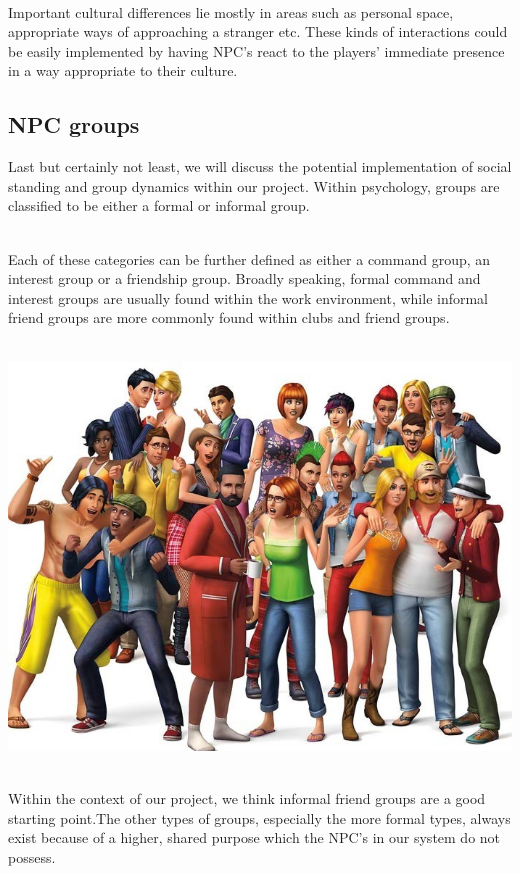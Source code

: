 \documentclass[11pt]{article} %
\begin{document}
~\\
Important cultural differences lie mostly in areas such as personal space, appropriate ways of approaching a stranger etc. These kinds of interactions could be easily implemented by having NPC's react to the players' immediate presence in a way appropriate to their culture.


\newpage
\subsection{NPC groups}
Last but certainly not least, we will discuss the potential implementation of social standing and group dynamics within our project. Within psychology, groups are classified to be either a formal or informal group. 

~\\
Each of these categories can be further defined as either a command group, an interest group or a friendship group. Broadly speaking, formal command and interest groups are usually found within the work environment, while informal friend groups are more commonly found within clubs and friend groups. 

~\\
\includegraphics[scale=0.4]{SimsGroup}


~\\
Within the context of our project, we think informal friend groups are a good starting point.The other types of groups, especially the more formal types, always exist because of a higher, shared purpose which the NPC's in our system do not possess. 
\end{document}

